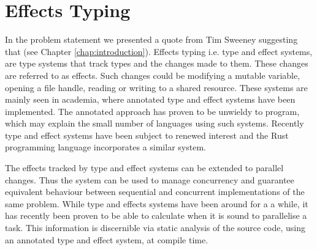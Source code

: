 \section{Effects Typing}
In the problem statement we presented a quote from Tim Sweeney suggesting that  (see Chapter \ref{chap:introduction}). Effects typing i.e. type and effect systems, are type systems that track types and the changes made to them\cite{nielson1999type}. These changes are referred to as effects. Such changes could be modifying a mutable variable, opening a file handle, reading or writing to a shared resource. These systems are mainly seen in academia, where annotated type and effect systems have been implemented. The annotated approach has proven to be unwieldy to program\cite{toro2015customizable}, which may explain the small number of languages using such systems. Recently type and effect systems have been subject to renewed interest and the Rust programming language incorporates a similar system\cite{rust:lang}.

The effects tracked by type and effect systems can be extended to parallel changes. Thus the system can be used to manage concurrency and guarantee equivalent behaviour between sequential and concurrent implementations of the same problem\cite{krogh2017relational}. While type and effects systems have been around for a a while, it has recently been proven to be able to calculate when it is sound to parallelise a task\cite{birkedal2012concurrent}. This information is discernible via static analysis of the source code, using an annotated type and effect system, at compile time.
